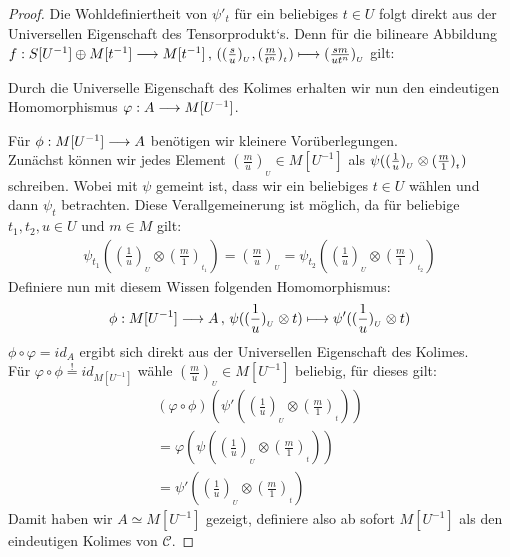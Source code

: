 \documentclass[10pt,a4paper]{report}
\newcommand{\functionfront}[3]{\nolinebreak{#1:#2 \longrightarrow #3}}
\newcommand{\function}[5]{\nolinebreak{#1:#2 \longrightarrow #3 \, , \, #4 \longmapsto #5}}
\newcommand{\Tensor}[3]{#1 \otimes_{#2} #3}
\newcommand{\tensor}[3]{#1 \otimes #3}
\newcommand{\lok}[2]{#1 [#2^{-1}]}
\newcommand{\loke}[3]{(\frac{#1}{#2})_{_{#3}}}
\newcommand*{\defshow}{\stackrel{!}{=}}
\begin{document}
\begin{proof}
Die Wohldefiniertheit von $\psi'_t$ für ein beliebiges $t \in U$ folgt direkt aus der Universellen Eigenschaft des Tensorprodukt`s. Denn für die bilineare Abbildung
 $\function{f}{\lok{S}{U} \oplus \lok{M}{t}}{\lok{M}{t}}{(\loke{s}{u}{U}, \loke{m}{t^n}{t})}{\loke{sm}{ut^n}{U}}$  gilt:
\begin{center}
\end{center} 
Durch die Universelle Eigenschaft des Kolimes erhalten wir nun den eindeutigen Homomorphismus $\functionfront{\varphi}{A}{\lok{M}{U}}$.
\begin{center}
\end{center}
Für $\functionfront{\phi}{\lok{M}{U}}{A}$ benötigen wir kleinere Vorüberlegungen.\\
Zunächst können wir jedes Element $\loke{m}{u}{U} \in \lok{M}{U}$ als $\nolinebreak{\psi(\tensor{\loke{1}{u}{U}}{\lok{M}{t}}{\loke{m}{1}{t}}})$ schreiben.
Wobei mit $\psi$ gemeint ist, dass wir ein beliebiges $t \in U$ wählen und dann $\psi_t$ betrachten. Diese Verallgemeinerung ist möglich, da für beliebige $t_1,t_2,u \in U$ und $m \in M$ gilt:
\begin{gather*}
\psi_{t_1}({\tensor{\loke{1}{u}{U}}{\lok{M}{t_1}}{\loke{m}{1}{t_1}}}) =
\loke{m}{u}{U} = 
\psi_{t_2}({\tensor{\loke{1}{u}{U}}{\lok{M}{t_2}}{\loke{m}{1}{t_2}}})
\end{gather*}
Definiere nun mit diesem Wissen folgenden Homomorphismus:
\begin{gather*}
\function{\phi}{\lok{M}{U}}{A}{\psi(\tensor{\loke{1}{u}{U}}{\lok{\loke{m}{1}{}}{M}}{t})}{\psi'(\tensor{\loke{1}{u}{U}}{\lok{\loke{m}{1}{t}}{M}}{t})}
\end{gather*}
$\phi \circ \varphi = id_A$ ergibt sich direkt aus der Universellen Eigenschaft des Kolimes.\\
Für $\varphi \circ \phi \defshow id_{\lok{M}{U}}$ wähle $\loke{m}{u}{U} \in \lok{M}{U}$ beliebig, für dieses gilt:
\begin{gather*}
(\varphi \circ \phi) (\psi'(\tensor{\loke{1}{u}{U}}{\lok{M}{t}}{\loke{m}{1}{t}})) \\
 =\varphi(\psi(\tensor{\loke{1}{u}{U}}{\lok{M}{t}}{\loke{m}{1}{t}})) \\
  =\psi'(\tensor{\loke{1}{u}{U}}{\lok{M}{t}}{\loke{m}{1}{t}})
\end{gather*}
Damit haben wir $A \simeq \lok{M}{U}$ gezeigt, definiere also ab sofort $\lok{M}{U}$ als den eindeutigen Kolimes von $\mathcal{C}$.
\end{proof}
\end{document}
